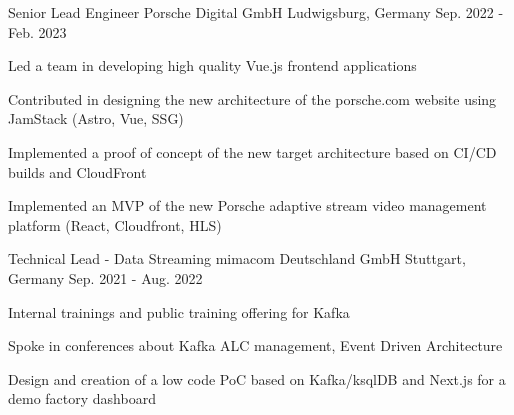 \begin{cventries}
  \cventry
    {Senior Lead Engineer} %
    {Porsche Digital GmbH} %
    {Ludwigsburg, Germany} %
    {Sep. 2022 - Feb. 2023} %
    {
      \begin{cvitems} %
        \item {Led a team in developing high quality Vue.js frontend applications}
        \item {Contributed in designing the new architecture of the porsche.com website using JamStack (Astro, Vue, SSG)}
        \item {Implemented a proof of concept of the new target architecture based on CI/CD builds and CloudFront}
        \item {Implemented an MVP of the new Porsche adaptive stream video management platform (React, Cloudfront, HLS)}
      \end{cvitems}
    }

  \cventry
    {Technical Lead - Data Streaming} %
    {mimacom Deutschland GmbH} %
    {Stuttgart, Germany} %
    {Sep. 2021 - Aug. 2022} %
    {
      \begin{cvitems} %
        \item {Internal trainings and public training offering for Kafka}
        \item {Spoke in conferences about Kafka ALC management, Event Driven Architecture}
        \item {Design and creation of a low code PoC based on Kafka/ksqlDB and Next.js for a demo factory dashboard}
      \end{cvitems}
    }


\end{cventries}
